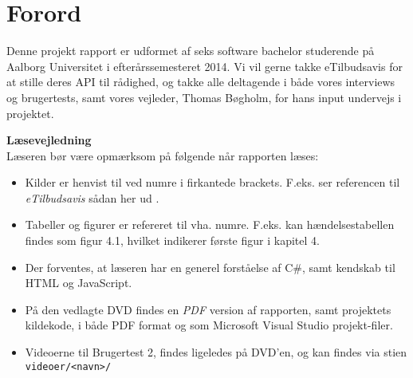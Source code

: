 \chapter*{Forord}

Denne projekt rapport er udformet af seks software bachelor studerende på Aalborg Universitet i efterårssemesteret 2014.
Vi vil gerne takke eTilbudsavis for at stille deres API til rådighed, og takke alle deltagende i både vores interviews og brugertests, samt vores vejleder, Thomas Bøgholm, for hans input undervejs i projektet.

\textbf{Læsevejledning}\hfill\\
Læseren bør være opmærksom på følgende når rapporten læses:

\begin{itemize}
	\item Kilder er henvist til ved numre i firkantede brackets. 
	F.eks. ser referencen til \textit{eTilbudsavis} sådan her ud \citep{eTilAPI}.
	\item Tabeller og figurer er refereret til vha. numre. F.eks. kan hændelsestabellen findes som figur 4.1, hvilket indikerer første figur i kapitel 4.
	\item Der forventes, at læseren har en generel forståelse af C\#, samt kendskab til HTML og JavaScript.
	\item På den vedlagte DVD findes en \textit{PDF} version af rapporten, samt projektets kildekode, i både PDF format og som Microsoft Visual Studio projekt-filer.
	\item Videoerne til Brugertest 2, findes ligeledes på DVD'en, og kan findes via stien \texttt{videoer/<navn>/}  
\end{itemize}